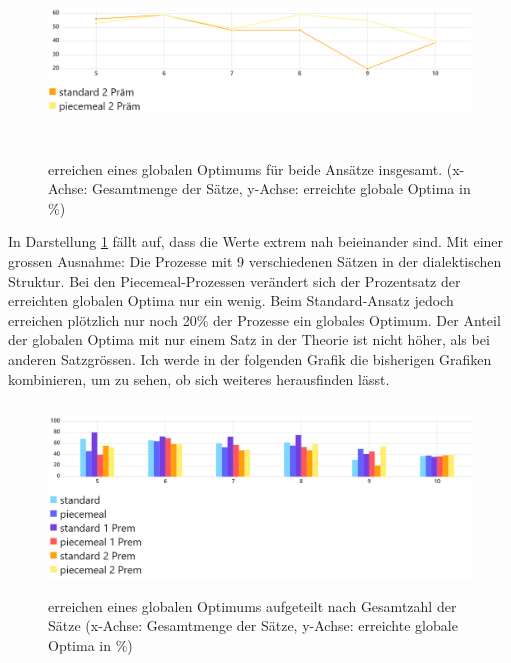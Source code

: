 \documentclass{article}
\begin{document}
\begin{figure}[htbp]
  \centering
  \includegraphics[width=\textwidth,height=5cm,keepaspectratio]{images/global_optima_standard_piecemeal_2prem.png}
  \caption{erreichen eines globalen Optimums für beide Ansätze insgesamt. (x-Achse: Gesamtmenge der Sätze, y-Achse: erreichte globale Optima in \%) \label{fig:GlobOptPoolsizeLineTwoPrem}}
\end{figure}

In Darstellung \ref{fig:GlobOptPoolsizeLineTwoPrem} fällt auf, dass die Werte extrem nah beieinander sind. Mit einer grossen Ausnahme: Die Prozesse mit 9 verschiedenen Sätzen in der dialektischen Struktur. Bei den Piecemeal-Prozessen verändert sich der Prozentsatz der erreichten globalen Optima nur ein wenig. Beim Standard-Ansatz jedoch erreichen plötzlich nur noch 20\% der Prozesse ein globales Optimum. Der Anteil der globalen Optima mit nur einem Satz in der Theorie ist nicht höher, als bei anderen Satzgrössen. Ich werde in der folgenden Grafik die bisherigen Grafiken kombinieren, um zu sehen, ob sich weiteres herausfinden lässt.

\begin{figure}[ht]
  \centering
  \includegraphics[width=\textwidth,height=5cm,keepaspectratio]{erreichen eines Globalen Optimums aufgeteilt nach Poolsize}
  \caption{erreichen eines globalen Optimums aufgeteilt nach Gesamtzahl der Sätze (x-Achse: Gesamtmenge der Sätze, y-Achse: erreichte globale Optima in \%) \label{fig:GlobOptPoolsize}}
\end{figure}
\end{document}
